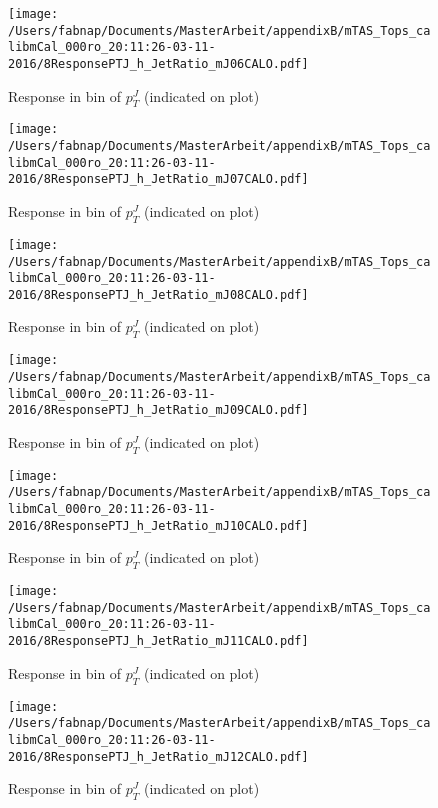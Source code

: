\begin{figure}

\texttt{[image: /Users/fabnap/Documents/MasterArbeit/appendixB/mTAS\_Tops\_calibmCal\_000ro\_20:11:26-03-11-2016/8ResponsePTJ\_h\_JetRatio\_mJ06CALO.pdf]}
\caption{Response in bin of  $p_{T}^{J}$ (indicated on plot)} 

\end{figure}

%
\begin{figure}

\texttt{[image: /Users/fabnap/Documents/MasterArbeit/appendixB/mTAS\_Tops\_calibmCal\_000ro\_20:11:26-03-11-2016/8ResponsePTJ\_h\_JetRatio\_mJ07CALO.pdf]}
\caption{Response in bin of  $p_{T}^{J}$ (indicated on plot)} 

\end{figure}


\begin{figure}

\texttt{[image: /Users/fabnap/Documents/MasterArbeit/appendixB/mTAS\_Tops\_calibmCal\_000ro\_20:11:26-03-11-2016/8ResponsePTJ\_h\_JetRatio\_mJ08CALO.pdf]}
\caption{Response in bin of  $p_{T}^{J}$ (indicated on plot)} 

\end{figure}

\begin{figure}

\texttt{[image: /Users/fabnap/Documents/MasterArbeit/appendixB/mTAS\_Tops\_calibmCal\_000ro\_20:11:26-03-11-2016/8ResponsePTJ\_h\_JetRatio\_mJ09CALO.pdf]}
\caption{Response in bin of  $p_{T}^{J}$ (indicated on plot)} 

\end{figure}

\begin{figure}

\texttt{[image: /Users/fabnap/Documents/MasterArbeit/appendixB/mTAS\_Tops\_calibmCal\_000ro\_20:11:26-03-11-2016/8ResponsePTJ\_h\_JetRatio\_mJ10CALO.pdf]}
\caption{Response in bin of  $p_{T}^{J}$ (indicated on plot)} 

\end{figure}

\begin{figure}

\texttt{[image: /Users/fabnap/Documents/MasterArbeit/appendixB/mTAS\_Tops\_calibmCal\_000ro\_20:11:26-03-11-2016/8ResponsePTJ\_h\_JetRatio\_mJ11CALO.pdf]}
\caption{Response in bin of  $p_{T}^{J}$ (indicated on plot)} 

\end{figure}

\begin{figure}

\texttt{[image: /Users/fabnap/Documents/MasterArbeit/appendixB/mTAS\_Tops\_calibmCal\_000ro\_20:11:26-03-11-2016/8ResponsePTJ\_h\_JetRatio\_mJ12CALO.pdf]}
\caption{Response in bin of  $p_{T}^{J}$ (indicated on plot)} 

\end{figure}
